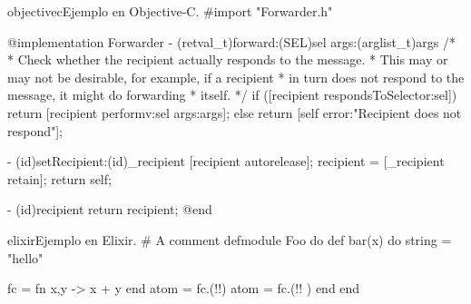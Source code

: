 \begin{sourcecode}{objectivec}{Ejemplo en Objective-C.}
#import "Forwarder.h"

@implementation Forwarder
- (retval_t)forward:(SEL)sel args:(arglist_t)args {
  /*
  * Check whether the recipient actually responds to the message.
  * This may or may not be desirable, for example, if a recipient
  * in turn does not respond to the message, it might do forwarding
  * itself.
  */
  if ([recipient respondsToSelector:sel]) {
    return [recipient performv:sel args:args];
  } else {
    return [self error:"Recipient does not respond"];
  }
}

- (id)setRecipient:(id)_recipient {
  [recipient autorelease];
  recipient = [_recipient retain];
  return self;
}

- (id)recipient {
  return recipient;
}
@end
\end{sourcecode}

\begin{sourcecode}{elixir}{Ejemplo en Elixir.}
# A comment
defmodule Foo do
	def bar(x) do
		string = "hello"

		fc = fn x,y -> x + y end 
		atom = fc.(!!)
		atom = fc.(!! )
	end
end
\end{sourcecode}

